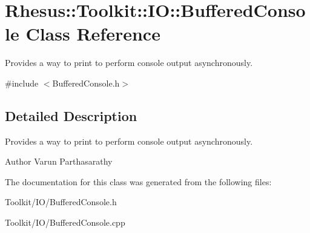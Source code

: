 \hypertarget{class_rhesus_1_1_toolkit_1_1_i_o_1_1_buffered_console}{\section{Rhesus\-:\-:Toolkit\-:\-:I\-O\-:\-:Buffered\-Console Class Reference}
\label{class_rhesus_1_1_toolkit_1_1_i_o_1_1_buffered_console}
}


Provides a way to print to perform console output asynchronously.  




{\ttfamily \#include $<$Buffered\-Console.\-h$>$}



\subsection{Detailed Description}
Provides a way to print to perform console output asynchronously. 

\begin{DoxyAuthor}{Author}
Varun Parthasarathy 
\end{DoxyAuthor}


The documentation for this class was generated from the following files\-:\begin{DoxyCompactItemize}
\item 
Toolkit/\-I\-O/Buffered\-Console.\-h\item 
Toolkit/\-I\-O/Buffered\-Console.\-cpp\end{DoxyCompactItemize}
